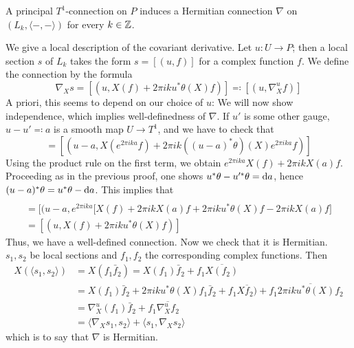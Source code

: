 \documentclass[parskip=half]{scrartcl}
\begin{document}
\begin{prop}
	A principal $T^1$-connection on $P$ induces a Hermitian connection $\nabla$ on $(L_k,\langle-,-\rangle)$ for every $k\in\mathbb{Z}$.
\end{prop}
\begin{myproof}
	We give a local description of the covariant derivative. Let $u:U\to P$; then a local section $s$ of $L_k$ takes the form $s=[(u,f)]$ for a complex function $f$. We define the connection by the formula
	\begin{equation*}
		\nabla_X s=[(u,X(f)+2\pi i k u^*\theta(X)f)]\eqqcolon [(u,\nabla^u_X f)]
	\end{equation*} 
	A priori, this seems to depend on our choice of $u$: We will now show independence, which implies well-definedness of $\nabla$. If $u'$ is some other gauge, $u-u'\eqqcolon a$ is a smooth map $U\to T^1$, and we have to check that
	\begin{equation*}
		[(u,X(f)+2\pi i k (u^*\theta)(X) f)]=[(u-a,X(e^{2\pi i k a}f)+2\pi i k ((u-a)^*\theta)(X) e^{2\pi i k a}f)]
	\end{equation*}
	Using the product rule on the first term, we obtain $e^{2\pi i k a}X(f)+2\pi i k X(a) f$. Proceeding as in the previous proof, one shows $u^*\theta-u'^*\theta=\mathrm{d} a$, hence $(u-a)^*\theta=u^*\theta-\mathrm{d} a$. This implies that 
	\begin{gather*}
		[(u-a,X(e^{2\pi i k a} f)+2\pi i k ((u-a)^*\theta)(X) e^{2\pi i k a} f)]\\
		=[(u-a,e^{2\pi i k a}\big[X(f)+2\pi i k X(a)f+2\pi i k u^*\theta(X)f-2\pi i k X(a)f\big]\\
		=[(u,X(f)+2\pi i k u^*\theta(X) f)]
	\end{gather*}
	Thus, we have a well-defined connection. Now we check that it is Hermitian. $s_1,s_2$ be local sections and $f_1,f_2$ the corresponding complex functions. Then
	\begin{align*}
		X(\langle s_1,s_2\rangle)&=X(f_1\bar f_2)=X(f_1)\bar f_2+f_1\overline{X (f_2)}\\
		&=X(f_1)\bar f_2+2\pi i k u^*\theta(X)f_1 \bar f_2 + f_1\overline{X f_2)}+f_1\overline{2\pi i k u^*\theta(X)f_2}\\
		&=\nabla^u_X(f_1)\bar f_2+f_1\overline{\nabla^u_X f_2}\\
		&=\langle \nabla_X s_1,s_2\rangle+\langle s_1,\nabla_X s_2\rangle
	\end{align*}
	which is to say that $\nabla$ is Hermitian.
\end{myproof}
\end{document}

